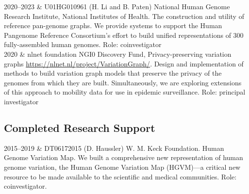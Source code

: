 \documentclass{nihbiosketch}
\begin{document}
\begin{datetbl}
  2020--2023 & U01HG010961 (H. Li and B. Paten) National Human Genome Research Institute, National Institutes of Health. The construction and utility of reference pan-genome graphs.
  We provide systems to support the Human Pangenome Reference Consortium's effort to build unified representations of 300 fully-assembled human genomes.
  Role: coinvestigator
  \\
  2020 & nlnet foundation NGI0 Discovery Fund, Privacy-preserving variation graphs \url{https://nlnet.nl/project/VariationGraph/}.
  Design and implementation of methods to build variation graph models that preserve the privacy of the genomes from which they are built.
  Simultaneously, we are exploring extensions of this approach to mobility data for use in epidemic surveillance.
  Role: principal investigator
\end{datetbl}




\subsection*{Completed Research Support}

\begin{datetbl}
2015--2019 & DT06172015 (D. Haussler) W. M. Keck Foundation. Human Genome Variation Map. We built a comprehensive new representation of human genome variation, the Human Genome Variation Map (HGVM)—a critical new resource to be made available to the scientific and medical communities.  Role: coinvestigator.


\end{datetbl}
\end{document}
